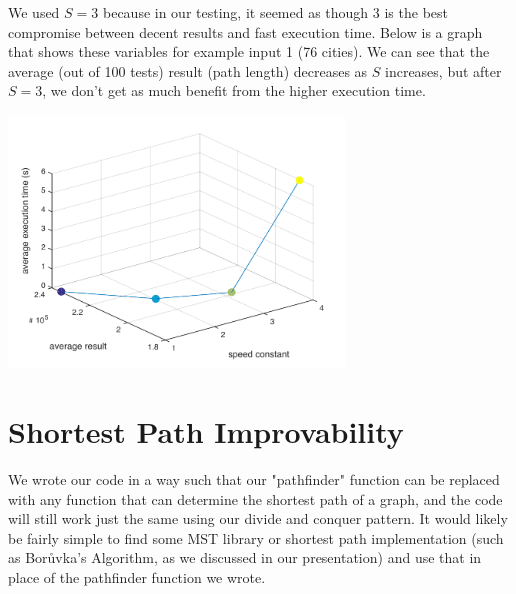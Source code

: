 \documentclass[12pt,letterpaper]{article}
\begin{document}
We used $S=3$ because in our testing, it seemed as though 3 is the best compromise between decent results and fast execution time. Below is a graph that shows these variables for example input 1 (76 cities). We can see that the average (out of 100 tests) result (path length) decreases as $S$ increases, but after $S=3$, we don't get as much benefit from the higher execution time.

\includegraphics[height=190pt]{fig1.pdf}

\section*{Shortest Path Improvability}

We wrote our code in a way such that our "pathfinder" function can be replaced with any function that can determine the shortest path of a graph, and the code will still work just the same using our divide and conquer pattern. It would likely be fairly simple to find some MST library or shortest path implementation (such as Bor\r{u}vka's Algorithm, as we discussed in our presentation) and use that in place of the pathfinder function we wrote.

\newpage
\end{document}
